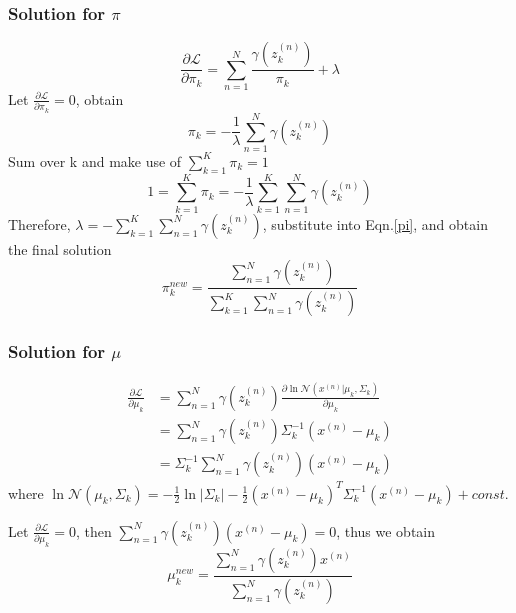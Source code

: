 \documentclass{article}
\begin{document}
\begin{spacing}{1.5}
\subsubsection{Solution for $\pi$}
\begin{equation}
\frac{\partial \mathcal{L}}{\partial \pi_k} = \sum_{n=1}^N \frac{\gamma (z^{(n)}_k)}{\pi_k} + \lambda
\end{equation}
Let $\frac{\partial \mathcal{L}}{\partial \pi_k}=0$, obtain
\begin{equation}
\pi_k = - \frac{1}{\lambda} \sum_{n=1}^N \gamma(z^{(n)}_k)
\label{pi}
\end{equation}
Sum over k and make use of $\sum_{k=1}^K \pi_k = 1$
\begin{equation}
1=\sum_{k=1}^K \pi_k = - \frac{1}{\lambda} \sum_{k=1}^K \sum_{n=1}^N \gamma(z^{(n)}_k)
\end{equation}
Therefore, $\lambda=-\sum_{k=1}^K \sum_{n=1}^N \gamma(z^{(n)}_k)$, substitute into Eqn.\ref{pi}, and obtain the final solution
\begin{equation}
\pi_k^{new} = \frac{\sum_{n=1}^N \gamma(z^{(n)}_k)}{\sum_{k=1}^K \sum_{n=1}^N \gamma(z^{(n)}_k)}
\end{equation}
\subsubsection{Solution for $\mu$}
\begin{equation}
\begin{aligned}
\frac{\partial \mathcal{L}}{\partial \mu_k} &= \sum_{n=1}^N \gamma (z^{(n)}_k)\frac{\partial \ln \mathcal{N}(x^{(n)}|\mu_k, \Sigma_k)}{\partial \mu_k} \\
&= \sum_{n=1}^N \gamma (z^{(n)}_k) \Sigma_k^{-1} (x^{(n)}-\mu_k) \\
&= \Sigma_k^{-1} \sum_{n=1}^N \gamma (z^{(n)}_k) (x^{(n)}-\mu_k)
\end{aligned}
\end{equation}
where $\ln \mathcal{N}(\mu_k, \Sigma_k)=-\frac{1}{2}\ln |\Sigma_k| - \frac{1}{2}(x^{(n)}-\mu_k)^T \Sigma_k^{-1}(x^{(n)}-\mu_k) + const$.

Let $\frac{\partial \mathcal{L}}{\partial \mu_k}=0$, then $\sum_{n=1}^N \gamma (z^{(n)}_k) (x^{(n)}-\mu_k)=0$, thus we obtain
\begin{equation}
\mu_k^{new} = \frac{\sum_{n=1}^N \gamma(z^{(n)}_k) x^{(n)}}{ \sum_{n=1}^N \gamma(z^{(n)}_k)}
\end{equation}

\end{spacing}
\end{document}
